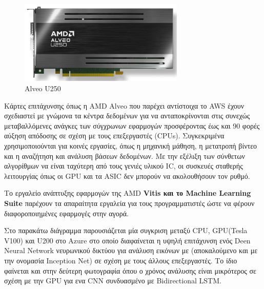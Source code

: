 \begin{figure}[h!]
  \centering
  \includegraphics[width=0.7\textwidth]{figures/chapter3/alveou250.png}
  \caption{Alveo U250}
  \label{fig:alveou250}
\end{figure}

Kάρτες επιτάχυνσης όπως η AMD Alveo που παρέχει αντίστοιχα το AWS έχουν σχεδιαστεί με γνώμονα τα κέντρα δεδομένων για να ανταποκρίνονται στις συνεχώς μεταβαλλόμενες ανάγκες των σύγχρωνων εφαρμογών 
προσφέροντας έως και 90 φορές αύξηση απόδοσης σε σχέση με τους επεξεργαστές (CPUs). Συγκεκριμένα χρησιμοποιούνται για κοινές εργασίες, όπως η μηχανική μάθηση,
η μετατροπή βίντεο και η αναζήτηση και ανάλυση βάσεων δεδομένων. Με την εξέλιξη των σύνθετων αλγορίθμων να είναι ταχύτερη από τους γενιές υλικού IC,
οι συσκευές σταθερής λειτουργίας όπως οι GPU και τα ASIC δεν μπορούν να ακολουθήσουν τον ρυθμό.


Το εργαλείο ανάπτυξης εφαρμογών της AMD \textbf{Vitis και το Machine Learning Suite} παρέχουν τα απαραίτητα εργαλεία για τους προγραμματιστές ώστε να φέρουν διαφοροποιημένες εφαρμογές στην αγορά.

Στο παρακάτω διάγραμμα παρουσιάζεται μία συγκριση μεταξύ CPU, GPU(Tesla V100) και U200 στο Azure στο οποίο διαφαίνεται η υψηλή επιτάχυνση ενός Deen Neural Network νευρωνικού δικτύου για ανάλυση εικόνων με 
(αποκαλούμενο και με την ονομασία Inception Net) σε σχέση με τους άλλους επεξεργαστές. Το ίδιο φαίνεται και στην δεύτερη φωτογραφία όπου ο χρόνος ανάλυσης είναι μικρότερος σε σχέση με την GPU για ενα CNN συνδυασμένο με Bidirectional LSTM.

